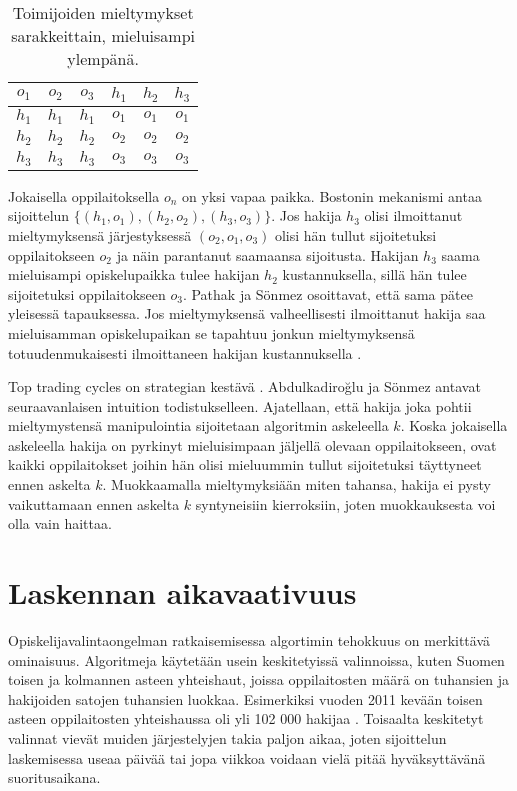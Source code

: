 \documentclass[gradu, twoside]{tktltiki}
\begin{document}
\begin{table}[ht]
  \begin{center}
    \begin{tabular}{ c c c | c c c }
      $o_1$ & $o_2$ & $o_3$ & $h_1$ & $h_2$ & $h_3$ \\
      \hline
      $h_1$ & $h_1$ & $h_1$ & $o_1$ & $o_1$ & $o_1$ \\
      $h_2$ & $h_2$ & $h_2$ & $o_2$ & $o_2$ & $o_2$ \\
      $h_3$ & $h_3$ & $h_3$ & $o_3$ & $o_3$ & $o_3$
    \end{tabular}
    \caption{Toimijoiden mieltymykset sarakkeittain, mieluisampi ylempänä.}
    \label{boston_strategia}
  \end{center}
\end{table}

Jokaisella oppilaitoksella $o_n$ on yksi vapaa paikka. Bostonin
mekanismi antaa sijoittelun $\{(h_1, o_1), (h_2, o_2), (h_3, o_3)\}$.
Jos hakija $h_3$ olisi ilmoittanut mieltymyksensä järjestyksessä
$(o_2, o_1, o_3)$ olisi hän tullut sijoitetuksi oppilaitokseen $o_2$
ja näin parantanut saamaansa sijoitusta. Hakijan $h_3$ saama
mieluisampi opiskelupaikka tulee hakijan $h_2$ kustannuksella, sillä
hän tulee sijoitetuksi oppilaitokseen $o_3$. Pathak ja Sönmez
osoittavat, että sama pätee yleisessä tapauksessa. Jos mieltymyksensä
valheellisesti ilmoittanut hakija saa mieluisamman opiskelupaikan se
tapahtuu jonkun mieltymyksensä totuudenmukaisesti ilmoittaneen hakijan
kustannuksella \cite{pathak08}.

Top trading cycles on strategian kestävä \cite{abdusön03}.
Abdulkadiroğlu ja Sönmez antavat seuraavanlaisen intuition
todistukselleen. Ajatellaan, että hakija joka pohtii mieltymystensä
manipulointia sijoitetaan algoritmin askeleella $k$. Koska jokaisella
askeleella hakija on pyrkinyt mieluisimpaan jäljellä olevaan
oppilaitokseen, ovat kaikki oppilaitokset joihin hän olisi mieluummin
tullut sijoitetuksi täyttyneet ennen askelta $k$. Muokkaamalla
mieltymyksiään miten tahansa, hakija ei pysty vaikuttamaan ennen
askelta $k$ syntyneisiin kierroksiin, joten muokkauksesta voi olla
vain haittaa.

\section{Laskennan aikavaativuus}

Opiskelijavalintaongelman ratkaisemisessa algortimin tehokkuus on
merkittävä ominaisuus. Algoritmeja käytetään usein keskitetyissä
valinnoissa, kuten Suomen toisen ja kolmannen asteen yhteishaut,
joissa oppilaitosten määrä on tuhansien ja hakijoiden satojen
tuhansien luokkaa. Esimerkiksi vuoden 2011 kevään toisen asteen
oppilaitosten yhteishaussa oli yli 102 000 hakijaa \cite{OPH12}.
Toisaalta keskitetyt valinnat vievät muiden järjestelyjen takia paljon
aikaa, joten sijoittelun laskemisessa useaa päivää tai jopa viikkoa
voidaan vielä pitää hyväksyttävänä suoritusaikana.
\end{document}
